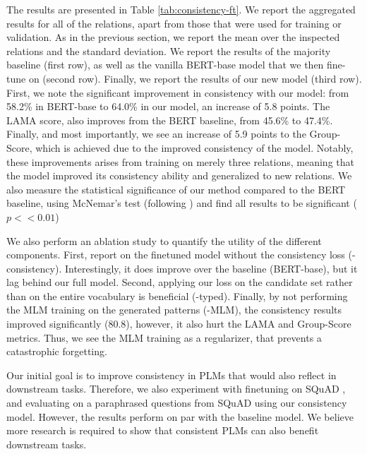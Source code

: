 The results are presented in Table \ref{tab:consistency-ft}. We report the aggregated results for all of the relations, apart from those that were used for training or validation. As in the previous section, we report the mean over the inspected relations and the standard deviation.
We report the results of the majority baseline (first row), as well as the vanilla BERT-base model that we then fine-tune on (second row). Finally, we report the results of our new model (third row).
First, we note the significant improvement in consistency with our model: from 58.2\% in BERT-base to 64.0\% in our model, an increase of 5.8 points.
The LAMA score, also improves from the BERT baseline, from 45.6\% to 47.4\%. Finally, and most importantly, we see an increase of 5.9 points to the Group-Score, which is achieved due to the improved consistency of the model.
Notably, these improvements arises from training on merely three relations, meaning that the model improved its consistency ability and generalized to new relations.
We also measure the statistical significance of our method compared to the BERT baseline, using McNemar's test (following \citet{dror2018hitchhiker,dror2020statistical}) and find all results to be significant ($p<<0.01$)

We also perform an ablation study to quantify the utility of the different components. First, report on the finetuned model without the consistency loss (-consistency). Interestingly, it does improve over the baseline (BERT-base), but it lag behind our full model.
Second, applying our loss on the candidate set rather than on the entire vocabulary is beneficial (-typed). Finally, by not performing the MLM training on the generated patterns (-MLM), the consistency results improved significantly (80.8), however, it also hurt the LAMA and Group-Score metrics. Thus, we see the MLM training as a regularizer, that prevents a catastrophic forgetting.

Our initial goal is to improve consistency in PLMs that would also reflect in downstream tasks. Therefore, we also experiment with finetuning on SQuAD \cite{squad}, and evaluating on a paraphrased questions from SQuAD \cite{squad-paraphrase} using our consistency model. However, the results perform on par with the baseline model.
We believe more research is required to show that consistent PLMs can also benefit downstream tasks.


